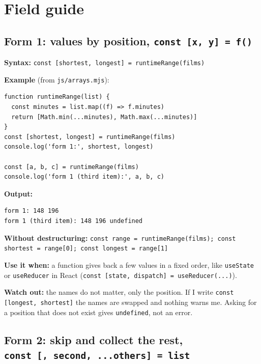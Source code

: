 \documentclass[
]{article}
\newcommand{\passthrough}[1]{#1}
\begin{document}
\hypertarget{field-guide}{%
\section{Field guide}\label{field-guide}}

\hypertarget{form-1-values-by-position-const-x-y-f}{%
\subsection{\texorpdfstring{Form 1: values by position,
\texttt{const\ {[}x,\ y{]}\ =\ f()}}{Form 1: values by position, const {[}x, y{]} = f()}}\label{form-1-values-by-position-const-x-y-f}}

\textbf{Syntax:}
\passthrough{\lstinline!const [shortest, longest] = runtimeRange(films)!}

\textbf{Example} (from \passthrough{\lstinline!js/arrays.mjs!}):

\begin{lstlisting}
function runtimeRange(list) {
  const minutes = list.map((f) => f.minutes)
  return [Math.min(...minutes), Math.max(...minutes)]
}
const [shortest, longest] = runtimeRange(films)
console.log('form 1:', shortest, longest)

const [a, b, c] = runtimeRange(films)
console.log('form 1 (third item):', a, b, c)
\end{lstlisting}

\textbf{Output:}

\begin{lstlisting}
form 1: 148 196
form 1 (third item): 148 196 undefined
\end{lstlisting}

\textbf{Without destructuring:}
\passthrough{\lstinline!const range = runtimeRange(films); const shortest = range[0]; const longest = range[1]!}

\textbf{Use it when:} a function gives back a few values in a fixed
order, like \passthrough{\lstinline!useState!} or
\passthrough{\lstinline!useReducer!} in React
(\passthrough{\lstinline!const [state, dispatch] = useReducer(...)!}).

\textbf{Watch out:} the names do not matter, only the position. If I
write \passthrough{\lstinline!const [longest, shortest]!} the names are
swapped and nothing warns me. Asking for a position that does not exist
gives \passthrough{\lstinline!undefined!}, not an error.

\hypertarget{form-2-skip-and-collect-the-rest-const-second-...others-list}{%
\subsection{\texorpdfstring{Form 2: skip and collect the rest,
\texttt{const\ {[},\ second,\ ...others{]}\ =\ list}}{Form 2: skip and collect the rest, const {[}, second, ...others{]} = list}}\label{form-2-skip-and-collect-the-rest-const-second-...others-list}}
\end{document}
